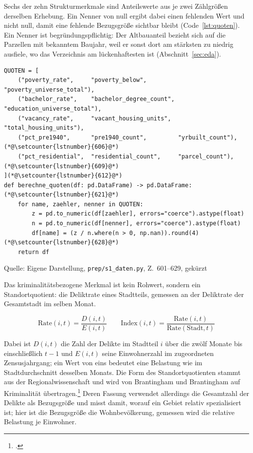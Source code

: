 \documentclass[12pt,a4paper]{article}
\newcommand{\tabquelle}[1][Eigene Darstellung]{%
  \par\setlength{\parskip}{0pt}\vspace{3pt}%
  {\setstretch{1}\fontsize{9pt}{11pt}\selectfont\raggedright Quelle: #1\par}%
}
\begin{document}
Sechs der zehn Strukturmerkmale sind Anteilswerte aus je zwei Zählgrößen
derselben Erhebung. Ein Nenner von null ergibt dabei einen fehlenden Wert und
nicht null, damit eine fehlende Bezugsgröße sichtbar bleibt
(Code~\ref{lst:quoten}). Ein Nenner ist begründungspflichtig: Der
Altbauanteil bezieht sich auf die Parzellen mit bekanntem Baujahr, weil er
sonst dort am stärksten zu niedrig ausfiele, wo das Verzeichnis am
lückenhaftesten ist (Abschnitt~\ref{sec:eda}).
 
\begin{quellcode}[htbp]
\caption{Anteilswerte aus Zählvariablen}
\label{lst:quoten}\vspace{-3.5pt}
\begin{lstlisting}[style=pythonstil,firstnumber=601]
QUOTEN = [
    ("poverty_rate",     "poverty_below",         "poverty_universe_total"),
    ("bachelor_rate",    "bachelor_degree_count", "education_universe_total"),
    ("vacancy_rate",     "vacant_housing_units",  "total_housing_units"),
    ("pct_pre1940",      "pre1940_count",         "yrbuilt_count"),(*@\setcounter{lstnumber}{606}@*)
    ("pct_residential",  "residential_count",     "parcel_count"),(*@\setcounter{lstnumber}{609}@*)
](*@\setcounter{lstnumber}{612}@*)
def berechne_quoten(df: pd.DataFrame) -> pd.DataFrame:(*@\setcounter{lstnumber}{621}@*)
    for name, zaehler, nenner in QUOTEN:
        z = pd.to_numeric(df[zaehler], errors="coerce").astype(float)
        n = pd.to_numeric(df[nenner], errors="coerce").astype(float)
        df[name] = (z / n.where(n > 0, np.nan)).round(4)(*@\setcounter{lstnumber}{628}@*)
    return df
\end{lstlisting}
\tabquelle[Eigene Darstellung, \texttt{prep/s1\_daten.py}, Z.~601--629, gekürzt]
\end{quellcode}
 
Das kriminalitätsbezogene Merkmal ist kein Rohwert, sondern ein
Standortquotient: die Deliktrate eines Stadtteils, gemessen an der Deliktrate
der Gesamtstadt im selben Monat.
 
\begin{equation*}
    \mathrm{Rate}(i,t) = \frac{D(i,t)}{E(i,t)}
    \qquad
    \mathrm{Index}(i,t) = \frac{\mathrm{Rate}(i,t)}{\mathrm{Rate}(\mathrm{Stadt},t)}
\end{equation*}
 
Dabei ist $D(i,t)$ die Zahl der Delikte im Stadtteil $i$ über die zwölf Monate
bis einschließlich $t-1$ und $E(i,t)$ seine Einwohnerzahl im zugeordneten
Zensusjahrgang; ein Wert von eins bedeutet eine Belastung wie im
Stadtdurchschnitt desselben Monats. Die Form des Standortquotienten stammt aus
der Regionalwissenschaft und wird von Brantingham und Brantingham auf
Kriminalität übertragen.\footcite[268-269]{Brantingham1997} Deren Fassung
verwendet allerdings die Gesamtzahl der Delikte als Bezugsgröße und misst
damit, worauf ein Gebiet relativ spezialisiert ist; hier ist die Bezugsgröße
die Wohnbevölkerung, gemessen wird die relative Belastung je Einwohner.
 
\end{document}
